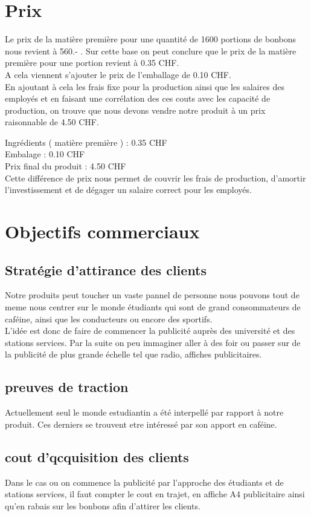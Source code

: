 \documentclass{article}
\begin{document}
\section{Prix}
Le prix de la matière première pour une quantité de 1600 portions de bonbons nous revient à 560.- . Sur cette base on peut conclure que le prix de la matière première pour une portion revient à 0.35 CHF.\\
A cela viennent s'ajouter le prix de l’emballage de 0.10 CHF.\\

En ajoutant à cela les frais fixe pour la production ainsi que les salaires des employés et en faisant une corrélation des ces couts avec les capacité de production, on trouve que nous devons vendre notre produit à un prix raisonnable de 4.50 CHF.

Ingrédients ( matière première ) : 0.35 CHF \\
Embalage : 0.10 CHF \\
Prix final du produit :  4.50 CHF\\

Cette différence de prix nous permet de couvrir les frais de production, d'amortir l'investissement et de dégager un salaire correct pour les employés.

\section{Objectifs commerciaux}
\subsection{Stratégie d'attirance des clients}
Notre produits peut toucher un vaste pannel de personne nous pouvons tout de meme
nous centrer sur le monde étudiants qui sont de grand consommateurs de caféine, ainsi que les conducteurs ou encore des sportifs.\\
L'idée est donc de faire de commencer la publicité auprès des université et des stations services. Par la suite on peu immaginer aller à des
foir ou passer sur de la publicité de plus grande échelle tel que radio, affiches publicitaires.
\subsection{preuves de traction}
Actuellement seul le monde estudiantin a été interpellé par rapport à notre produit. Ces derniers se trouvent etre intéressé par son apport en caféine.
\subsection{cout d'qcquisition des clients}
Dans le cas ou on commence la publicité par l'approche des étudiants et de stations services, il faut compter le cout en trajet, en affiche A4 publicitaire ainsi qu'en rabais sur les bonbons afin d'attirer les clients.
\end{document}
